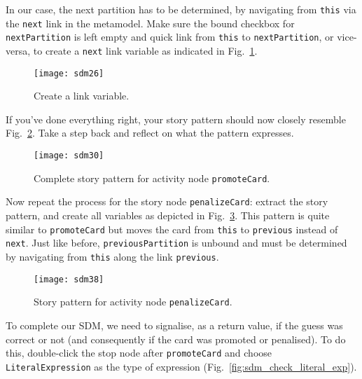 In our case, the next partition has to be determined, by navigating from \texttt{this} via the \texttt{next} link in the metamodel.  Make sure the bound
checkbox for \texttt{nextPartition} is left empty and quick link from \texttt{this} to \texttt{nextPartition}, or vice-versa, to create a \texttt{next} link
variable as indicated in Fig.~\ref{fig:sdm_check_link_variable}.

\begin{figure}[htbp]
\begin{center}
  \texttt{[image: sdm26]}
  \caption{Create a link variable.}
  \label{fig:sdm_check_link_variable}
\end{center}
\end{figure}

If you've done everything right, your story pattern should now closely resemble Fig.~\ref{fig:sdm_check_complete_activity_node}.  Take a step back and reflect
on what the pattern expresses.

\begin{figure}[htbp]
\begin{center}
  \texttt{[image: sdm30]}
  \caption{Complete story pattern for activity node \texttt{promoteCard}.}
  \label{fig:sdm_check_complete_activity_node}
\end{center}
\end{figure}

Now repeat the process for the story node \texttt{penalizeCard}: extract the story pattern, and create all variables as depicted in
Fig.~\ref{fig:sdm_check_complete_penalize}.  This pattern is quite similar to \texttt{promoteCard} but moves the card from \texttt{this} to \texttt{previous}
instead of \texttt{next}.  Just like before, \texttt{previousPartition} is unbound and must be determined by navigating from \texttt{this} along the link
\texttt{previous}.

\begin{figure}[htbp]
\begin{center}
  \texttt{[image: sdm38]}
  \caption{Story pattern for activity node \texttt{penalizeCard}.}
  \label{fig:sdm_check_complete_penalize}
\end{center}
\end{figure}

To complete our SDM, we need to signalise, as a return value, if the guess was correct or not (and consequently if the card was promoted or penalised).  To do
 this, double-click the stop node after \texttt{promoteCard} and choose \texttt{LiteralExpression} as the type of expression
(Fig.~\ref{fig:sdm_check_literal_exp}).

